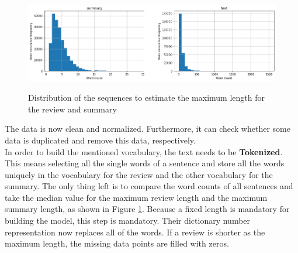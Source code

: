 \begin{figure}
	\begin{center}
		\includegraphics[width=6in]{photos/dist_seq}\\
		\caption{Distribution of the sequences to estimate the maximum length for the review and summary}\label{dist_seq}
	\end{center}
\end{figure}

The data is now clean and normalized. Furthermore, it can check whether some data is duplicated and remove this data, respectively. \\
In order to build the mentioned vocabulary, the text needs to be \textbf{Tokenized}. This means selecting all the single words of a sentence and store all the words uniquely in the vocabulary for the review and the other vocabulary for the summary. The only thing left is to compare the word counts of all sentences and take the median value for the maximum review length and the maximum summary length, as shown in Figure \ref{dist_seq}. Because a fixed length is mandatory for building the model, this step is mandatory. Their dictionary number representation now replaces all of the words. If a review is shorter as the maximum length, the missing data points are filled with zeros.

